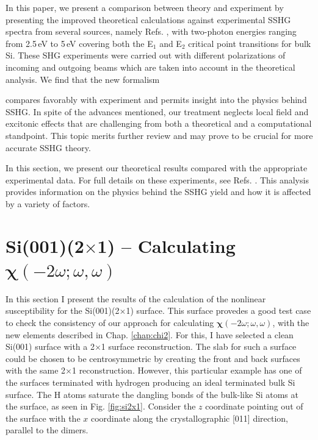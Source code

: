 \documentclass[11pt]{book}
\begin{document}
In this paper, we present a comparison between theory and experiment by presenting the improved theoretical calculations against experimental SSHG spectra from several sources, namely Refs. \cite{hoferAPA96, bergfeldPRL04, mejiaPRB02, mitchellSS01}, with two-photon energies ranging from 2.5\,eV to 5\,eV covering both the E$_{1}$ and E$_{2}$ critical point transitions for bulk Si. These SHG experiments were carried out with different polarizations of incoming and outgoing beams which are taken into account in the theoretical analysis. We find that the new formalism {compares favorably with experiment and permits insight into the physics behind SSHG. In spite of the advances mentioned, our treatment neglects local field and excitonic effects that are challenging from both a theoretical and a computational standpoint. This topic merits further review and may prove to be crucial for more accurate SSHG theory.

In this section, we present our theoretical results compared with the appropriate experimental data. For full details on these experiments, see Refs. \cite{hoferAPA96, mitchellSS01, mejiaPRB02, bergfeldPRL04}. This analysis provides information on the physics behind the SSHG yield and how it is affected by a variety of factors.



\section{\texorpdfstring{Si(001)(2$\times$1)}{Si(001)(2x1)} -- Calculating
\texorpdfstring{$\boldsymbol{\chi}(-2\omega;\omega,\omega)$}{X(-2w;w,w)}}
\label{sec:res2x1chi}

In this section I present the results of the calculation of the nonlinear
susceptibility for the Si(001)(2$\times$1) surface. This surface provedes a good
test case to check the consistency of our approach for calculating
$\boldsymbol{\chi}(-2\omega;\omega,\omega)$, with the new elements described in
Chap. \ref{chap:chi2}. For this, I have selected a clean Si(001) surface with a
2$\times$1 surface reconstruction. The slab for such a surface could be chosen
to be centrosymmetric by creating the front and back surfaces with the same
2$\times$1 reconstruction. However, this particular example has one of the
surfaces terminated with hydrogen producing an ideal terminated bulk Si surface.
The H atoms saturate the dangling bonds of the bulk-like Si atoms at the
surface, as seen in Fig. \ref{fig:si2x1}. Consider the $z$ coordinate pointing
out of the surface with the $x$ coordinate along the crystallographic [011]
direction, parallel to the dimers.

}
\end{document}
